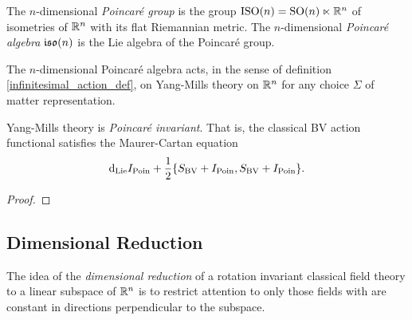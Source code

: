 \documentclass[10pt, oneside]{article}
\begin{document}
\begin{definition}
The $n$-dimensional \emph{Poincar\'e group} is the group $\mathrm{ISO}(n) = \mathrm{SO}(n) \ltimes \mathbb R^n$ of isometries of $\mathbb R^n$ with its flat Riemannian metric.  The $n$-dimensional \emph{Poincar\'e algebra} $\mathfrak{iso}(n)$ is the Lie algebra of the Poincar\'e group.
\end{definition}

The $n$-dimensional Poincar\'e algebra acts, in the sense of definition \ref{infinitesimal_action_def}, on Yang-Mills theory on $\mathbb R^n$ for any choice $\Sigma$ of matter representation.

\begin{prop} \label{YM_Poincare_invariant_prop}
Yang-Mills theory is \emph{Poincar\'e invariant}.  That is, the classical BV action functional satisfies the Maurer-Cartan equation
\[{\rm d}_{\mathrm{Lie}}I_{\mathrm{Poin}} + \frac 12 \{S_{\mathrm{BV}} + I_{\mathrm{Poin}}, S_{\mathrm{BV}} + I_{\mathrm{Poin}}\}.\]
\end{prop}

\begin{proof}
\end{proof}

\subsection{Dimensional Reduction} \label{dim_red_section}
The idea of the \emph{dimensional reduction} of a rotation invariant classical field theory to a linear subspace of $\mathbb R^n$ is to restrict attention to only those fields with are constant in directions perpendicular to the subspace. 
\end{document}
